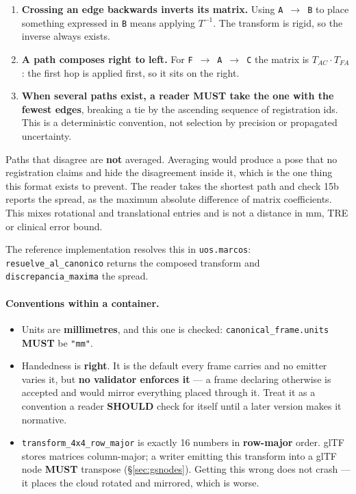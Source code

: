 \documentclass[11pt,a4paper]{article}
\newcommand{\MUST}{\textcolor{uosred}{\textbf{MUST}}}
\newcommand{\SHOULD}{\textcolor{uosamber}{\textbf{SHOULD}}}
\newcommand{\code}[1]{\texttt{\small #1}}
\begin{document}
\begin{enumerate}
  \item \textbf{Crossing an edge backwards inverts its matrix.} Using
  \code{A}~$\to$~\code{B} to place something expressed in \code{B} means applying
  $T^{-1}$. The transform is rigid, so the inverse always exists.
  \item \textbf{A path composes right to left.} For \code{F}~$\to$~\code{A}~$\to$~\code{C}
  the matrix is $T_{AC} \cdot T_{FA}$: the first hop is applied first, so it sits on the
  right.
  \item \textbf{When several paths exist, a reader \MUST{} take the one with the fewest
  edges}, breaking a tie by the ascending sequence of registration ids. This is a
  deterministic convention, not selection by precision or propagated uncertainty.
\end{enumerate}

Paths that disagree are \textbf{not} averaged. Averaging would produce a pose that no
registration claims and hide the disagreement inside it, which is the one thing this format
exists to prevent. The reader takes the shortest path and check 15b reports the spread,
as the maximum absolute difference of matrix coefficients. This mixes rotational and
translational entries and is not a distance in mm, TRE or clinical error bound.

The reference implementation resolves this in \code{uos.marcos}:
\code{resuelve\_al\_canonico} returns the composed transform and
\code{discrepancia\_maxima} the spread.

\paragraph{Conventions within a container.}

\begin{itemize}
  \item Units are \textbf{millimetres}, and this one is checked:
  \code{canonical\_frame.units} \MUST{} be \code{"mm"}.
  \item Handedness is \textbf{right}. It is the default every frame carries and no emitter
  varies it, but \textbf{no validator enforces it} --- a frame declaring otherwise is
  accepted and would mirror everything placed through it. Treat it as a convention a reader
  \SHOULD{} check for itself until a later version makes it normative.
  \item \code{transform\_4x4\_row\_major} is exactly 16 numbers in \textbf{row-major}
  order. glTF stores matrices column-major; a writer emitting this transform into a glTF
  node \MUST{} transpose (\S\ref{sec:gsnodes}). Getting this wrong does not crash --- it
  places the cloud rotated and mirrored, which is worse.
\end{itemize}
\end{document}
